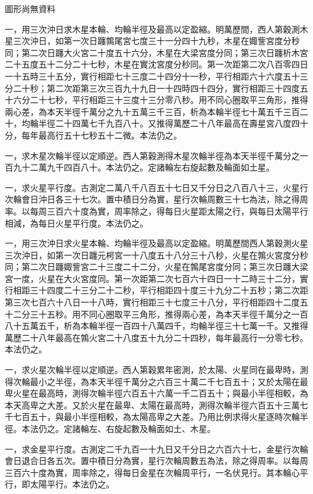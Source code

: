 \begin{pinyinscope}
圖形尚無資料

一，用三次沖日求木星本輪、均輪半徑及最高以定盈縮。明萬歷間，西人第穀測木星三次沖日，如第一次日躔鶉尾宮七度三十一分四十九秒，木星在娵訾宮度分秒同；第二次日躔大火宮二十度五十六分，木星在大梁宮度分同；第三次日躔析木宮二十五度五十二分二十七秒，木星在實沈宮度分秒同。第一次距第二次八百零四日一十五時三十五分，實行相距七十三度二十四分十一秒，平行相距六十六度五十三分二十秒；第二次距第三次三百九十九日一十四時四十四分，實行相距三十四度五十六分二十七秒，平行相距三十三度十三分零八秒。用不同心圈取平三角形，推得兩心差，為本天半徑千萬分之九十五萬三千三百，析為本輪半徑七十萬五千三百二十，均輪半徑二十四萬七千九百八十。又推得萬歷二十八年最高在壽星宮八度四十分，每年最高行五十七秒五十二微。本法仍之。

一，求木星次輪半徑以定順逆。西人第穀測得木星次輪半徑為本天半徑千萬分之一百九十二萬九千四百八十。本法仍之。定諸輪左右旋起數及輪面如土星。

一，求火星平行度。古測定二萬八千八百五十七日又千分日之八百八十三，火星行次輪會日沖日各三十七次。置中積日分為實，星行次輪周數三十七為法，除之得周率。以每周三百六十度為實，周率除之，得每日火星距太陽之行，與每日太陽平行相減，為每日火星平行度。本法仍之。

一，用三次沖日求火星本輪、均輪半徑及最高以定盈縮。明萬歷間西人第穀測火星三次沖日，如第一次日躔元枵宮一十八度五十八分三十八秒，火星在鶉火宮度分秒同；第二次日躔娵訾宮二十三度二十二分，火星在鶉尾宮度分同；第三次日躔大梁宮一度，火星在大火宮度同。第一次距第二次七百六十四日一十二時三十二分，實行相距三十四度二十三分二十二秒，平行相距四十度三十九分二十五秒；第二次距第三次七百六十八日一十八時，實行相距三十七度三十八分，平行相距四十二度五十二分三十五秒。用不同心圈取平三角形，推得兩心差，為本天半徑千萬分之一百八十五萬五千，析為本輪半徑一百四十八萬四千，均輪半徑三十七萬一千。又推得萬歷二十八年最高在鶉火宮二十八度五十九分二十四秒，每年最高行一分零七秒。本法仍之。

一，求火星次輪半徑以定順逆。西人第穀累年密測，於太陽、火星同在最卑時，測得次輪最小之半徑，為本天半徑千萬分之六百三十萬二千七百五十；又於太陽在最卑火星在最高時，測得次輪半徑六百五十六萬一千二百五十；與最小半徑相較，為本天高卑之大差。又於火星在最卑、太陽在最高時，測得次輪半徑六百五十三萬七千七百五十，與最小半徑相較，為太陽高卑之大差。乃用比例求得火星逐時次輪半徑。本法仍之。定諸輪左、右旋起數及輪面如土、木星。

一，求金星平行度。古測定二千九百一十九日又千分日之六百六十七，金星行次輪會日退合日各五次。置中積日分為實，星行次輪周數五為法，除之得周率。以每周三百六十度為實，周率除之，得每日金星在次輪周平行，一名伏見行。其本輪心平行，即太陽平行。本法仍之。


\end{pinyinscope}
